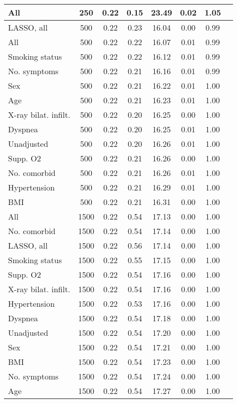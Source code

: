 \documentclass{article}
\begin{document}
{\begin{longtable}{lccccccc}
All & 250 & 0.22 & 0.15 & 23.49 & 0.02 & 1.05 \\ \midrule 
LASSO, all & 500 & 0.22 & 0.23 & 16.04 & 0.00 & 0.99 \\ 
All & 500 & 0.22 & 0.22 & 16.07 & 0.01 & 0.99 \\ 
Smoking status & 500 & 0.22 & 0.22 & 16.12 & 0.01 & 0.99 \\ 
No. symptoms & 500 & 0.22 & 0.21 & 16.16 & 0.01 & 0.99 \\ 
Sex & 500 & 0.22 & 0.21 & 16.22 & 0.01 & 1.00 \\ 
Age & 500 & 0.22 & 0.21 & 16.23 & 0.01 & 1.00 \\ 
X-ray bilat. infilt. & 500 & 0.22 & 0.20 & 16.25 & 0.00 & 1.00 \\ 
Dyspnea & 500 & 0.22 & 0.20 & 16.25 & 0.01 & 1.00 \\ 
Unadjusted & 500 & 0.22 & 0.20 & 16.26 & 0.01 & 1.00 \\ 
Supp. O2 & 500 & 0.22 & 0.21 & 16.26 & 0.00 & 1.00 \\ 
No. comorbid & 500 & 0.22 & 0.21 & 16.26 & 0.01 & 1.00 \\ 
Hypertension & 500 & 0.22 & 0.21 & 16.29 & 0.01 & 1.00 \\ 
BMI & 500 & 0.22 & 0.21 & 16.31 & 0.00 & 1.00 \\ \midrule 
All & 1500 & 0.22 & 0.54 & 17.13 & 0.00 & 1.00 \\ 
No. comorbid & 1500 & 0.22 & 0.54 & 17.14 & 0.00 & 1.00 \\ 
LASSO, all & 1500 & 0.22 & 0.56 & 17.14 & 0.00 & 1.00 \\ 
Smoking status & 1500 & 0.22 & 0.55 & 17.15 & 0.00 & 1.00 \\ 
Supp. O2 & 1500 & 0.22 & 0.54 & 17.16 & 0.00 & 1.00 \\ 
X-ray bilat. infilt. & 1500 & 0.22 & 0.54 & 17.16 & 0.00 & 1.00 \\ 
Hypertension & 1500 & 0.22 & 0.53 & 17.16 & 0.00 & 1.00 \\ 
Dyspnea & 1500 & 0.22 & 0.54 & 17.18 & 0.00 & 1.00 \\ 
Unadjusted & 1500 & 0.22 & 0.54 & 17.20 & 0.00 & 1.00 \\ 
Sex & 1500 & 0.22 & 0.54 & 17.21 & 0.00 & 1.00 \\ 
BMI & 1500 & 0.22 & 0.54 & 17.23 & 0.00 & 1.00 \\ 
No. symptoms & 1500 & 0.22 & 0.54 & 17.24 & 0.00 & 1.00 \\ 
Age & 1500 & 0.22 & 0.54 & 17.27 & 0.00 & 1.00 \\
\bottomrule
\hline
\end{longtable}
}
\end{document}
